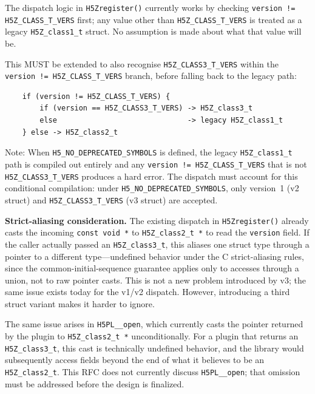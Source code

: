 \documentclass[../HDF5_RFC.tex]{subfiles}
\begin{document}
The dispatch logic in \texttt{H5Zregister()} currently works by checking
\texttt{version != H5Z\_CLASS\_T\_VERS} first; any value other than
\texttt{H5Z\_CLASS\_T\_VERS} is treated as a legacy \texttt{H5Z\_class1\_t} struct.
No assumption is made about what that value will be.

This MUST be extended to also recognise \texttt{H5Z\_CLASS3\_T\_VERS} within the
\texttt{version != H5Z\_CLASS\_T\_VERS} branch, before falling back to the legacy path:

\begin{verbatim}
    if (version != H5Z_CLASS_T_VERS) {
        if (version == H5Z_CLASS3_T_VERS) -> H5Z_class3_t
        else                              -> legacy H5Z_class1_t
    } else -> H5Z_class2_t
\end{verbatim}

Note: When \texttt{H5\_NO\_DEPRECATED\_SYMBOLS} is defined, the legacy
\texttt{H5Z\_class1\_t} path is compiled out entirely and any
\texttt{version != H5Z\_CLASS\_T\_VERS} that is not \texttt{H5Z\_CLASS3\_T\_VERS}
produces a hard error. The dispatch must account for this conditional
compilation: under \texttt{H5\_NO\_DEPRECATED\_SYMBOLS}, only version~1 (v2 struct)
and \texttt{H5Z\_CLASS3\_T\_VERS} (v3 struct) are accepted.

\textbf{Strict-aliasing consideration.}
The existing dispatch in \texttt{H5Zregister()} already casts the incoming
\texttt{const void~*} to \texttt{H5Z\_class2\_t~*} to read the \texttt{version} field.
If the caller actually passed an \texttt{H5Z\_class3\_t}, this aliases one struct
type through a pointer to a different type---undefined behavior under the
C strict-aliasing rules, since the common-initial-sequence guarantee applies
only to accesses through a union, not to raw pointer casts.  This is not a new
problem introduced by v3; the same issue exists today for the v1/v2 dispatch.
However, introducing a third struct variant makes it harder to ignore.

The same issue arises in \texttt{H5PL\_\_open}, which currently casts the pointer
returned by the plugin to \texttt{H5Z\_class2\_t~*} unconditionally.  For a plugin
that returns an \texttt{H5Z\_class3\_t}, this cast is technically undefined behavior,
and the library would subsequently access fields beyond the end of what it
believes to be an \texttt{H5Z\_class2\_t}.  This RFC does not currently discuss
\texttt{H5PL\_\_open}; that omission must be addressed before the design is finalized.
\end{document}
